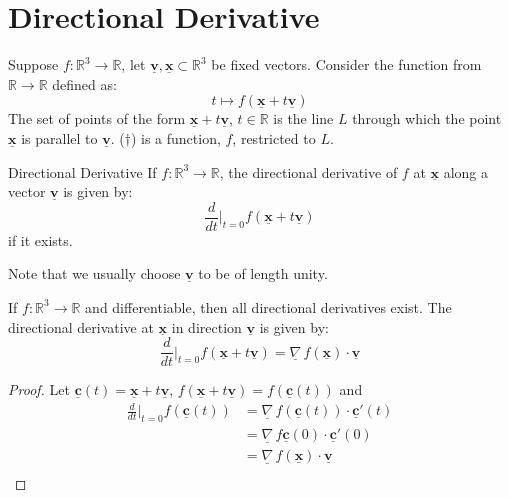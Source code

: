 \documentclass{article}
\newcommand{\R}{\mathbb{R}}
\newcommand{\sub}{\subset}
\renewcommand{\vec}[1]{\underline{\textbf{#1}}}
\newcommand{\nab}{\underline{\nabla}}
\newcommand{\grad}{{\nab}\, f}
\begin{document}
\section{Directional Derivative}

\begin{figure}[H]
  \centering
\end{figure}
Suppose $f: \R^3 \to \R$, let $\vec v, \vec x\sub \R^3$ be fixed vectors. Consider the function from $\R\to\R$ defined as:
\begin{equation*}
  t \mapsto f(\vec x + t\vec v)\tag{$\dagger$}
\end{equation*}
The set of points of the form $\vec x + t\vec v$, $t\in \R$ is the line $L$ through which the point $\vec x$ is parallel to $\vec v$. ($\dagger$) is a function, $f$, restricted to $L$.
 \noindent\begin{definition}{Directional Derivative}{}
  If $f: \R^3 \to \R$, the directional derivative of $f$ at $\vec x$ along a vector $\vec v$ is given by:
  $$ \frac{d}{dt}\Bigr|_{t=0}f(\vec x + t\vec v) $$ if it exists.
 \end{definition}\vspace{10pt}
\noindent Note that we usually choose $\vec v$ to be of length unity.

\noindent\begin{theorem}{}{}
  If $f: \R^3 \to \R$ and differentiable, then all directional derivatives exist. The directional derivative at $\vec x$ in direction $\vec v$ is given by:
  $$ \frac{d}{dt}\Bigr|_{t=0}f(\vec x + t\vec v) = \grad(\vec x)\cdot \vec v $$
\end{theorem}\vspace{10pt}
\begin{proof}
  Let $\vec c(t) = \vec x + t\vec v$, $f(\vec x + t\vec v) = f(\vec c(t))$ and
  \begin{align*}
    \frac{d}{dt}\Bigr|_{t=0} f(\vec c (t)) &= \grad(\vec c(t))\cdot \vec c'(t) \\
    &= \grad{\vec c(0)}\cdot \vec c'(0)\\
    &= \grad(\vec x)\cdot\vec v\\
  \end{align*}
\end{proof}
\end{document}
